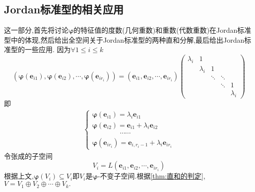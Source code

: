 \subsection{Jordan标准型的相关应用}
这一部分,首先将讨论$\bm{\varphi}$的特征值的度数(几何重数)和重数(代数重数)在Jordan标准型中的体现,然后给出全空间关于Jordan标准型的两种直和分解,最后给出Jordan标准型的一些应用.
因为$\forall 1\leqslant i\leqslant k$\[
    \left(
    \bm{\varphi}\left(\bm{e}_{i1}\right),\bm{\varphi}\left(\bm{e}_{i2}\right),\cdots,\bm{\varphi}\left(\bm{e}_{ir_i}\right)
    \right)=\left(
    \bm{e}_{i1},\bm{e}_{i2},\cdots,\bm{e}_{ir_i}
    \right)\begin{pmatrix}
        \lambda_i & 1         &        &        &           \\
                  & \lambda_i & 1      &                    \\
                  &           & \ddots & \ddots &           \\
                  &           &        & \ddots & 1         \\
                  &           &        &        & \lambda_i
    \end{pmatrix}
\]即\begin{align*}
    \begin{cases*}
        \bm{\varphi}\left(\bm{e}_{i1}\right)=\lambda_i\bm{e}_{i1}             \\
        \bm{\varphi}\left(\bm{e}_{i2}\right)=\bm{e}_{i1}+\lambda_i\bm{e}_{i2} \\
        \qquad\qquad\cdots\cdots                                              \\
        \bm{\varphi}\left(\bm{e}_{ir_i}\right)=\bm{e}_{i,r_i-1}+\lambda_i\bm{e}_{ir_i}
    \end{cases*}\tag{$*$}
\end{align*}令张成的子空间\[
    V_i=L\left(
    \bm{e}_{i1},\bm{e}_{i2},\cdots,\bm{e}_{ir_i}
    \right)
\]根据上文,$\bm{\varphi}\left(V_i\right)\subseteq V_i$即$V_i$是$\bm{\varphi}$-不变子空间.根据\cref{thm:直和的判定},$V=V_1\oplus V_2\oplus\cdots\oplus V_k.$
